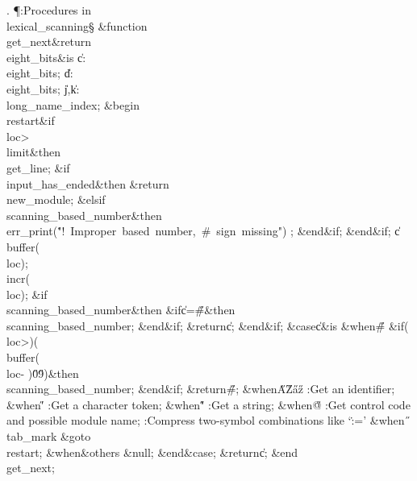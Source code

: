. \P\?:Procedures in \\{lexical\_scanning}\X\mathrel{+}\S\?\6
\&{function}\8\1\\{get\_next}\?\8\&{return}\?\8\\{eight\_bits}\2\8\&{is}\8%
\1\6
\|c\?:\?\\{eight\_bits};\6
\|d\?:\?\\{eight\_bits};\6
\|j\?,\?\|k\?:\?\\{long\_name\_index};\6
\4\&{begin}\6
\4\BL\\{restart}\EL\8\&{if}\1\1\8\\{loc}\?>\?\\{limit}\2\8\&{then}\6
\\{get\_line};\6
\&{if}\1\1\8\\{input\_has\_ended}\2\8\&{then}\6
\?\&{return}\?\8\\{new\_module};\6
\4\&{elsif}\1\8\\{scanning\_based\_number}\2\8\&{then}\6
\\{err\_print}\?\1(\?\.{"!\ Improper\ based\ number,\ \#\ sign\ missing"}\?\2)%
\?;\2\6
\&{end}\8\2\&{if}\1;\2\6
\&{end}\8\2\&{if}\1;\6
\|c\?\K\?\\{buffer}\?\1(\?\\{loc}\?\2)\?;\5
\\{incr}\?\1(\?\\{loc}\?\2)\?;\6
\&{if}\1\1\8\\{scanning\_based\_number}\2\8\&{then}\6
\&{if}\1\1\8\|c\?=\?\H{\#}\2\8\&{then}\6
\\{scanning\_based\_number}\?\K\?;\2\6
\&{end}\8\2\&{if}\1;\6
\?\&{return}\?\8\|c;\2\6
\&{end}\8\2\&{if}\1;\6
\&{case}\1\8\|c\1\8\&{is}\8\6
\4\&{when}\8\H{\#}\KR\6
\&{if}\1\1\?\8\1(\?\\{loc}\?>\?\2)\ANT\1(\?\\{buffer}\?\1(\?\\{loc}\?-\?%
\2)\in\?\H{0}\?\to\?\H{9}\?\2)\?\2\8\&{then}\6
\\{scanning\_based\_number}\?\K\?;\2\6
\&{end}\8\2\&{if}\1;\6
\?\&{return}\?\8\H{\#};\6
\4\&{when}\8\H{A}\?\to\?\H{Z}\?\mathrel{\.|}\?\H{a}\?\to\?\H{z}\KR\6
:Get an identifier\X;\6
\4\&{when}\8\H{\'}\KR\6
:Get a character token\X;\6
\4\&{when}\8\H{"}\KR\6
:Get a string\X;\6
\4\&{when}\8\H{@}\KR\6
:Get control code and possible module name\X;\6
\hbox{\4}:Compress two-symbol combinations like `\.{:=}'\X\6
\4\&{when}\8\H{\ }\?\mathrel{\.|}\?\\{tab\_mark}\KR\6
\&{goto}\8\\{restart};\6
\4\&{when}\8\&{others}\8\KR\6
\&{null};\2\6
\4\2\&{end}\8\&{case};\6
\?\&{return}\?\8\|c;\2\6
\&{end}\8\\{get\_next};\par
\fi

